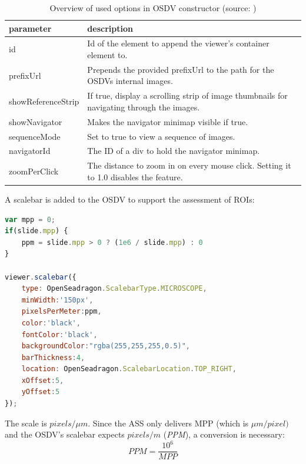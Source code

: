 \begin{table}[H]
	\begin{center}
		\begin{tabular}{| p{3.5cm} | p{6.5cm} |}
			\hline
			\textbf{parameter} & \textbf{description}\\ \hline
			id & Id of the element to append the viewer's container element to.\\ \hline
			prefixUrl & Prepends the provided prefixUrl to the path for the OSDVs internal images.\\ \hline
			showReferenceStrip & If true, display a scrolling strip of image thumbnails for navigating through the images.\\ \hline
			showNavigator & Makes the navigator minimap visible if true. \\ \hline
			sequenceMode & Set to true to view a sequence of images.\\ \hline
			navigatorId & The ID of a div to hold the navigator minimap.\\ \hline
			zoomPerClick & The distance to zoom in on every mouse click. Setting it to 1.0 disables the feature.\\ \hline
		\end{tabular}
		\caption{Overview of used options in OSDV constructor (source: \cite{web:openseadragon})}
		\label{tab4_osdvParams}
	\end{center}
\end{table}

A scalebar is added to the OSDV to support the assessment of ROIs:

\begin{lstlisting}[title=as{\textunderscore}viewer.js, frame=single, language=JavaScript]
var mpp = 0;
if(slide.mpp) {
	ppm = slide.mpp > 0 ? (1e6 / slide.mpp) : 0
}

viewer.scalebar({
	type: OpenSeadragon.ScalebarType.MICROSCOPE,
	minWidth:'150px',
	pixelsPerMeter:ppm,
	color:'black',
	fontColor:'black',
	backgroundColor:"rgba(255,255,255,0.5)",
	barThickness:4,
	location: OpenSeadragon.ScalebarLocation.TOP_RIGHT,
	xOffset:5,
	yOffset:5
});
\end{lstlisting}

The scale is $pixels/{\mu}m$. Since the ASS only delivers MPP (which is ${\mu}m/pixel)$ and the OSDV's scalebar expects $pixels/m$ (\emph{PPM}), a conversion is necessary:
\begin{equation}\label{eq:ppm}
	PPM = \frac{10^6}{MPP}
\end{equation}

